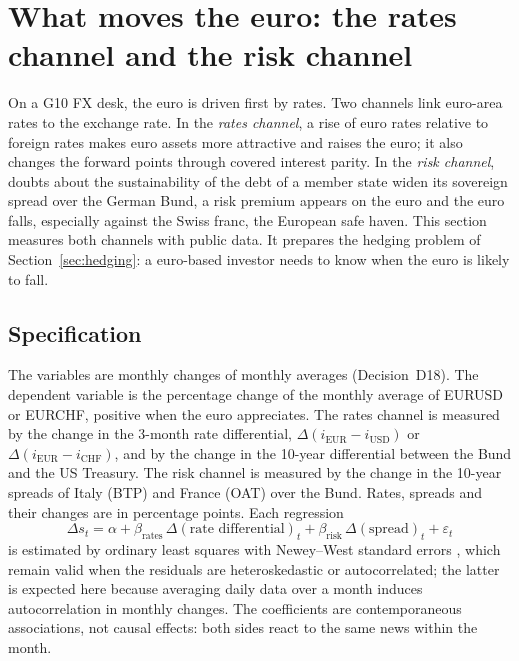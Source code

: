 \section{What moves the euro: the rates channel and the risk channel}\label{sec:euro}

On a G10 FX desk, the euro is driven first by rates.
Two channels link euro-area rates to the exchange rate.
In the \emph{rates channel}, a rise of euro rates relative to foreign rates makes euro assets more attractive and raises the euro; it also changes the forward points through covered interest parity.
In the \emph{risk channel}, doubts about the sustainability of the debt of a member state widen its sovereign spread over the German Bund, a risk premium appears on the euro and the euro falls, especially against the Swiss franc, the European safe haven.
This section measures both channels with public data.
It prepares the hedging problem of Section~\ref{sec:hedging}: a euro-based investor needs to know when the euro is likely to fall.

\subsection{Specification}

The variables are monthly changes of monthly averages (Decision~D18).
The dependent variable is the percentage change of the monthly average of EURUSD or EURCHF, positive when the euro appreciates.
The rates channel is measured by the change in the 3-month rate differential, $\Delta(i_{\mathrm{EUR}} - i_{\mathrm{USD}})$ or $\Delta(i_{\mathrm{EUR}} - i_{\mathrm{CHF}})$, and by the change in the 10-year differential between the Bund and the US Treasury.
The risk channel is measured by the change in the 10-year spreads of Italy (BTP) and France (OAT) over the Bund.
Rates, spreads and their changes are in percentage points.
Each regression
\begin{equation}\label{eq:euro-reg}
  \Delta s_t = \alpha + \beta_{\mathrm{rates}}\, \Delta(\text{rate differential})_t + \beta_{\mathrm{risk}}\, \Delta(\text{spread})_t + \varepsilon_t
\end{equation}
is estimated by ordinary least squares with Newey--West standard errors \citep{newey1987}, which remain valid when the residuals are heteroskedastic or autocorrelated; the latter is expected here because averaging daily data over a month induces autocorrelation in monthly changes.
The coefficients are contemporaneous associations, not causal effects: both sides react to the same news within the month.

